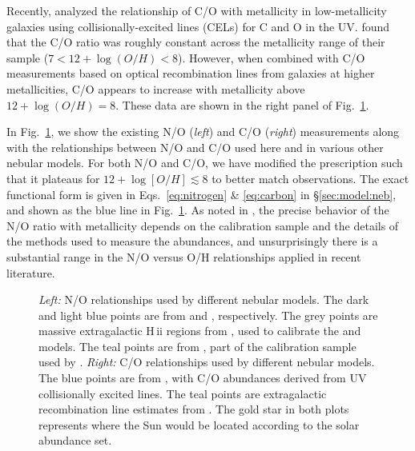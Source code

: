 \documentclass[preprint2]{aastex61}
\newcommand{\hii}{H\,{\sc ii}\xspace}
\begin{document}
Recently, \citet{Berg+2016} analyzed the relationship of C/O with metallicity in low-metallicity galaxies using collisionally-excited lines (CELs) for C and O in the UV. \citet{Berg+2016} found that the C/O ratio was roughly constant across the metallicity range of their sample ($7<12+\log(O/H)<8$). However, when combined with C/O measurements based on optical recombination lines from galaxies at higher metallicities, C/O appears to increase with metallicity above $12+\log(O/H)=8$. These data are shown in the right panel of Fig.~\ref{fig:CNO}.

In Fig.~\ref{fig:CNO}, we show the existing N/O (\emph{left}) and C/O (\emph{right}) measurements along with the relationships between N/O and C/O used here and in various other nebular models. For both N/O and C/O, we have modified the \citet{Dopita+2013} prescription such that it plateaus for $12+\log[ O/H ] \lesssim 8$ to better match observations. The exact functional form is given in Eqs.~\ref{eq:nitrogen} \& \ref{eq:carbon} in \S\ref{sec:model:neb}, and shown as the blue line in Fig.~\ref{fig:CNO}. As noted in \citet{Steidel+2014}, the precise behavior of the N/O ratio with metallicity depends on the calibration sample and the details of the methods used to measure the abundances, and unsurprisingly there is a substantial range in the N/O versus O/H relationships applied in recent literature.

\begin{figure}
  \begin{center}
    \caption{\emph{Left:} N/O relationships used by different nebular models. The dark and light blue points are from \citet{Berg+2016} and \citet{Berg+2012}, respectively. The grey points are massive extragalactic \hii regions from \citet{vanZee+1998}, used to calibrate the \citet{Dopita+2013} and \citet{Dopita+2000} models. The teal points are from \citet{Contini+2002}, part of the calibration sample used by \citet{Gutkin+2016}. \emph{Right:} C/O relationships used by different nebular models. The blue points are from \citet{Berg+2016}, with C/O abundances derived from UV collisionally excited lines. The teal points are extragalactic recombination line estimates from \citet{Esteban+2014}. The gold star in both plots represents where the Sun would be located according to the \citet{Asplund+2009} solar abundance set.}
    \label{fig:CNO}
  \end{center}
\end{figure}
\end{document}
